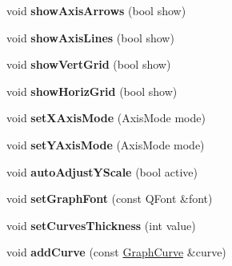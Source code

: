 \begin{DoxyCompactItemize}
\item 
\hypertarget{class_graph_view_ad471e0de364be156a44b2056091dc576}{void {\bfseries show\-Axis\-Arrows} (bool show)}\label{class_graph_view_ad471e0de364be156a44b2056091dc576}

\item 
\hypertarget{class_graph_view_a742364ea59c5ab340b1a657a490e7453}{void {\bfseries show\-Axis\-Lines} (bool show)}\label{class_graph_view_a742364ea59c5ab340b1a657a490e7453}

\item 
\hypertarget{class_graph_view_a9b16f0b68e4270e31c56939e24d4d165}{void {\bfseries show\-Vert\-Grid} (bool show)}\label{class_graph_view_a9b16f0b68e4270e31c56939e24d4d165}

\item 
\hypertarget{class_graph_view_ad27da260c44ffa0826329d71377d2a30}{void {\bfseries show\-Horiz\-Grid} (bool show)}\label{class_graph_view_ad27da260c44ffa0826329d71377d2a30}

\item 
\hypertarget{class_graph_view_a41a971c83665b27788debad99f787cdf}{void {\bfseries set\-X\-Axis\-Mode} (Axis\-Mode mode)}\label{class_graph_view_a41a971c83665b27788debad99f787cdf}

\item 
\hypertarget{class_graph_view_ac36d8ab1f9967d6899706e2c9416cb83}{void {\bfseries set\-Y\-Axis\-Mode} (Axis\-Mode mode)}\label{class_graph_view_ac36d8ab1f9967d6899706e2c9416cb83}

\item 
\hypertarget{class_graph_view_a484fe80f43f8e2c8f66c06c816ad0f42}{void {\bfseries auto\-Adjust\-Y\-Scale} (bool active)}\label{class_graph_view_a484fe80f43f8e2c8f66c06c816ad0f42}

\item 
\hypertarget{class_graph_view_a885d19eacc902dc867cce28341b905cc}{void {\bfseries set\-Graph\-Font} (const Q\-Font \&font)}\label{class_graph_view_a885d19eacc902dc867cce28341b905cc}

\item 
\hypertarget{class_graph_view_a33f4309a057683fb8f287cc899312e0e}{void {\bfseries set\-Curves\-Thickness} (int value)}\label{class_graph_view_a33f4309a057683fb8f287cc899312e0e}

\item 
\hypertarget{class_graph_view_a8ed03da055922bd200a1190bbc446366}{void {\bfseries add\-Curve} (const \hyperlink{class_graph_curve}{Graph\-Curve} \&curve)}\label{class_graph_view_a8ed03da055922bd200a1190bbc446366}


\end{DoxyCompactItemize}
